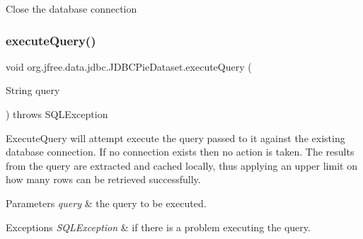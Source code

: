 Close the database connection \mbox{\label{classorg_1_1jfree_1_1data_1_1jdbc_1_1_j_d_b_c_pie_dataset_a683c9d8a431081ae4a8b2941b1d17633}} 
\subsubsection{\texorpdfstring{execute\+Query()}{executeQuery()}\hspace{0.1cm}{\footnotesize\ttfamily [1/2]}}
{\footnotesize\ttfamily void org.\+jfree.\+data.\+jdbc.\+J\+D\+B\+C\+Pie\+Dataset.\+execute\+Query (\begin{DoxyParamCaption}\item[{String}]{query }\end{DoxyParamCaption}) throws S\+Q\+L\+Exception}

Execute\+Query will attempt execute the query passed to it against the existing database connection. If no connection exists then no action is taken. The results from the query are extracted and cached locally, thus applying an upper limit on how many rows can be retrieved successfully.


\begin{DoxyParams}{Parameters}
{\em query} & the query to be executed.\\
\hline
\end{DoxyParams}

\begin{DoxyExceptions}{Exceptions}
{\em S\+Q\+L\+Exception} & if there is a problem executing the query. \\
\hline
\end{DoxyExceptions}
\mbox{\label{classorg_1_1jfree_1_1data_1_1jdbc_1_1_j_d_b_c_pie_dataset_adce5416eb519021f1fdd956025abf8b6}} 
